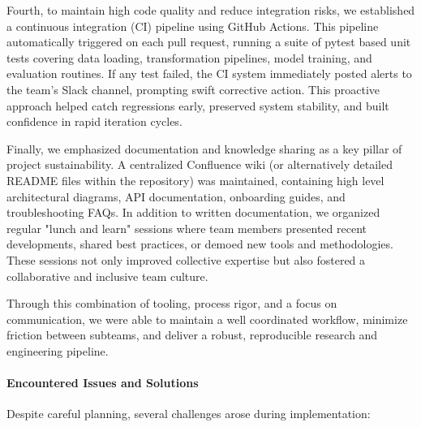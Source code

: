 \documentclass{article}
\begin{document}
Fourth, to maintain high code quality and reduce integration risks, we established a continuous integration (CI) pipeline using GitHub Actions. This pipeline automatically triggered on each pull request, running a suite of pytest based unit tests covering data loading, transformation pipelines, model training, and evaluation routines. If any test failed, the CI system immediately posted alerts to the team’s Slack channel, prompting swift corrective action. This proactive approach helped catch regressions early, preserved system stability, and built confidence in rapid iteration cycles.

Finally, we emphasized documentation and knowledge sharing as a key pillar of project sustainability. A centralized Confluence wiki (or alternatively detailed README files within the repository) was maintained, containing high level architectural diagrams, API documentation, onboarding guides, and troubleshooting FAQs. In addition to written documentation, we organized regular "lunch and learn" sessions where team members presented recent developments, shared best practices, or demoed new tools and methodologies. These sessions not only improved collective expertise but also fostered a collaborative and inclusive team culture.

Through this combination of tooling, process rigor, and a focus on communication, we were able to maintain a well coordinated workflow, minimize friction between subteams, and deliver a robust, reproducible research and engineering pipeline.

\paragraph{Encountered Issues and Solutions}  
Despite careful planning, several challenges arose during implementation:
\end{document}
